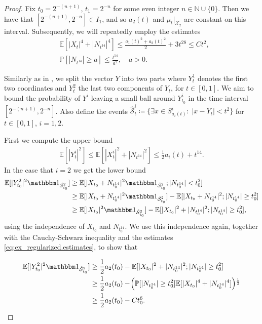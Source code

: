 \documentclass[12pt,oneside]{amsart}
\theoremstyle{definition}
\newcommand{\N}{\mathbb N}
\newcommand{\X}{\mathcal X}
\newcommand{\Scc}{\hat{\mathcal S}}
\def\P{{\mathbb P}}
\def\E{{\mathbb E}}
\numberwithin{equation}{section}
\begin{document}
\begin{proof}
	Fix $t_0 = 2^{-(n+1)}$, $t_1 = 2^{-n}$ for some even integer $n \in \N \cup \{ 0 \}$. Then we have that $[2^{-(n+1)}, 2^{-n}] \in I_1$, and so $a_2(t)$ and $\mu_t |_{\X_2}$ are constant on this interval.    
    Subsequently, we will repeatedly employ the estimates
    \begin{equation}\label{eq:ex_regularized.estimates}
    \begin{split}
        & \E[|X_t|^4 + |N_{t^{14}}|^4] \le \frac{a_1(t)^2 + a_2(t)^2}{2} + 3 t^{28} \le C t^2,\\
        & \P[|N_{t^{14}}| \ge a] \le \frac{t^{14}}{a^2}, \quad a > 0.
	\end{split}
    \end{equation}

	Similarly as in , we split the vector $Y$ into two parts where $Y^1_t$ denotes the first two coordinates and $Y^2_t$ the last two components of $Y_t$, for $t \in [0, 1]$. We aim to bound the probability of $Y^i$ leaving a small ball around $Y^i_{t_0}$ in the time interval $[2^{-(n +1)}, 2^{-n}]$.
	Also define the events $\Scc^i_{t} \coloneqq \{\exists x \in S^i_{a_i(t)} \colon \; |x - Y_t| < t^2\}$ for $t \in [0, 1]$, $i = 1,2$.
	
	First we compute the upper bound
    \begin{align}\label{eq:ex_regularized.ub}
        \E[|Y^i_t|^2] \le \E[|X_t^i|^2 + |N_{t^{14}}|^2] \le \frac12 a_i(t) + t^{14}.
    \end{align}
    In the case that $i = 2$ we get the lower bound
    \begin{align}
        \E[|Y_{t_0}^2|^2 \mathbbm 1_{\Scc_{t_0}^2}] & \ge  \E[|X_{t_0} + N_{t_0^{14}}|^2 \mathbbm 1_{\Scc_{t_0}^2}; |N_{t_0^{14}}| < t_0^2]\\
        &\ge
        \E[|X_{t_0} + N_{t_0^{14}} |^2\mathbbm 1_{\Scc_{t_0}^2}] - \E[|X_{t_0} + N_{t_0^{14}}|^2; |N_{t_0^{14}}| \ge t_0^2]
        \\
        &\ge \E[|X_{t_0}|^2\mathbbm 1_{\Scc_{t_0}^2}] - \E[|X_{t_0}|^2 + |N_{t_0^{14}}|^2; |N_{t_0^{14}}| \ge t_0^2],
    \end{align}
    using the independence of $X_{t_0}$ and $N_{t_0^{14}}$. We use this independence again, together with the Cauchy-Schwarz inequality and the estimates \eqref{eq:ex_regularized.estimates}, to show that
    
    \begin{align}
    	 \E[|Y_{t_0}^2|^2 \mathbbm 1_{\Scc_{t_0}^2}] &\ge \frac12 a_2(t_0) - \E[|X_{t_0}|^2 + |N_{t_0^{14}}|^2; |N_{t_0^{14}}| \ge t_0^2 ] \\
        &\ge \frac12 a_2(t_0) - \!\left(\P[|N_{t_0^{14}}| \ge t_0^2] \E[|X_{t_0}|^4 + |N_{t_0^{14}}|^4]\right)\!^\frac12
        \\
        &\ge \frac12 a_2(t_0) - C t_0^6.
    \end{align}
    

\end{proof}
\end{document}
